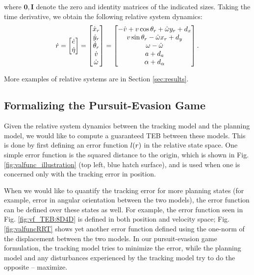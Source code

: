 {	\noindent where $\mathbf 0, \mathbf I$ denote the zero and identity matrices of the indicated sizes.
	Taking the time derivative, we obtain the following relative system dynamics:
	\begin{equation}
	\label{eq:5D_and_3D_rdyn}
	\dot \rstate = 
	\begin{bmatrix}
	\dot \estate\\
	\dot \astate
	\end{bmatrix}
	=
	\begin{bmatrix}
	\dot x_r\\
	\dot y_r\\
	\dot\theta_r\\
	\dot v\\
	\dot \omega
	\end{bmatrix}
	=
	\begin{bmatrix}
	- \hat v + v \cos \theta_r + \hat \omega y_r + \dstb_x\\
	v \sin \theta_r - \hat \omega x_r + \dstb_y\\
	\omega - \hat \omega \\
	a + \dstb_a\\
	\alpha + \dstb_\alpha
	\end{bmatrix}.
	\end{equation}
}

More examples of relative systems are in Section \ref{sec:results}.

\subsection{Formalizing the Pursuit-Evasion Game}
Given the relative system dynamics between the tracking model and the planning model, we would like to compute a guaranteed TEB between these models. 
This is done by first defining an error function $l(r)$ in the relative state space. 
One simple error function is the squared distance to the origin, which is shown in Fig. \ref{fig:valfunc_illustration} (top left, blue hatch surface), and is used when one is concerned only with the tracking error in position.

When we would like to quantify the tracking error for more planning states (for example, error in angular orientation between the two models), the error function can be defined over these states as well.
For example, the error function seen in Fig. \ref{fig:vf_TEB:8D4D} is defined in both position and velocity space; Fig. \ref{fig:valfuncRRT} shows yet another error function defined using the one-norm of the displacement between the two models. 
In our pursuit-evasion game formulation, the tracking model tries to minimize the error, while the planning model and any disturbances experienced by the tracking model try to do the opposite -- maximize.

